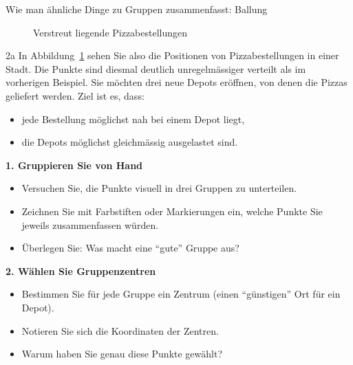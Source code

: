 \begin{lpu}{Wie man ähnliche Dinge zu Gruppen zusammenfasst: Ballung}
\begin{figure}[h]
\caption{Verstreut liegende Pizzabestellungen}
\label{fig:pizza_kmeans_variante}
\end{figure}

\begin{aufgabe}{2a}
In Abbildung~\ref{fig:pizza_kmeans_variante} sehen Sie also die Positionen von Pizzabestellungen in einer Stadt. Die Punkte sind diesmal deutlich unregelmässiger verteilt als im vorherigen Beispiel. Sie möchten drei neue Depots eröffnen, von denen die Pizzas geliefert werden. Ziel ist es, dass:

\begin{itemize}
  \item jede Bestellung möglichst nah bei einem Depot liegt,
  \item die Depots möglichst gleichmässig ausgelastet sind.
\end{itemize}

\vspace{1em}
\textbf{1. Gruppieren Sie von Hand}

\begin{itemize}
  \item Versuchen Sie, die Punkte visuell in drei Gruppen zu unterteilen.
  \item Zeichnen Sie mit Farbstiften oder Markierungen ein, welche Punkte Sie jeweils zusammenfassen würden.
  \item Überlegen Sie: Was macht eine ``gute'' Gruppe aus?
\end{itemize}

\vspace{1em}
\textbf{2. Wählen Sie Gruppenzentren}

\begin{itemize}
  \item Bestimmen Sie für jede Gruppe ein Zentrum (einen ``günstigen'' Ort für ein Depot).
  \item Notieren Sie sich die Koordinaten der Zentren.
  \item Warum haben Sie genau diese Punkte gewählt?
\end{itemize}
\end{aufgabe}


\end{lpu}
